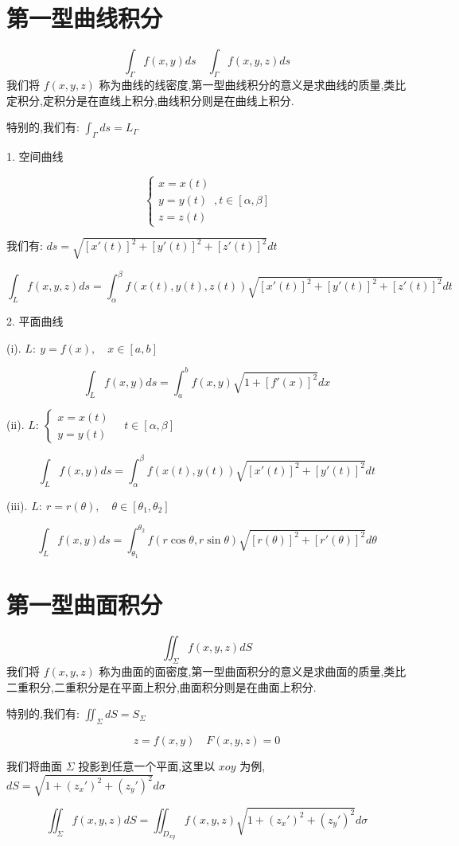 \section{第一型曲线积分}
\begin{definition}[第一型曲线积分]
	$$\int_{\Gamma}f(x,y)ds\quad \int_{\Gamma}f(x,y,z)ds$$
	我们将 $f(x,y,z)$ 称为曲线的线密度,第一型曲线积分的意义是求曲线的质量,类比定积分,定积分是在直线上积分,曲线积分则是在曲线上积分.
	
	特别的,我们有: $\int_{\Gamma}ds=L_{\Gamma}$
\end{definition}
\begin{theorem}[曲线积分的求解]
	
	1. 空间曲线
	
	$$\left\lbrace \begin{array}{l}
		x=x(t)\\
		y=y(t)\\
		z=z(t)
	\end{array}\right. ,t\in[\alpha,\beta]$$
	
	我们有: $ds=\sqrt{[x'(t)]^{2}+[y'(t)]^{2}+[z'(t)]^{2}}dt$
	
	$$\int_{L}f(x,y,z)ds=\int_{\alpha}^{\beta}f(x(t),y(t),z(t))\sqrt{[x'(t)]^{2}+[y'(t)]^{2}+[z'(t)]^{2}}dt$$
	
	2. 平面曲线
	
	(i). $L:\ y=f(x),\quad x\in[a,b]$
	
	$$\int_{L}f(x,y)ds=\int_{a}^{b}f(x,y)\sqrt{1+[f'(x)]^2}dx$$
	
	(ii). $L:\ \left\lbrace \begin{array}{l}
		x=x(t)\\
		y=y(t)
	\end{array}\right.\quad t\in[\alpha,\beta]$
	
	$$\int_{L}f(x,y)ds=\int_{\alpha}^{\beta}f(x(t),y(t))\sqrt{[x'(t)]^2+[y'(t)]^2}dt$$
	
	(iii). $L:\ r=r(\theta),\quad \theta\in[\theta_{1},\theta_{2}]$
	
	$$\int_{L}f(x,y)ds=\int_{\theta_{1}}^{\theta_{2}}f(r\cos \theta,r\sin\theta)\sqrt{[r(\theta)]^2+[r'(\theta)]^2}d\theta$$
\end{theorem}

\section{第一型曲面积分}
\begin{definition}[第一型曲面积分]
	$$\iint_{\Sigma}f(x,y,z)dS$$
	我们将 $f(x,y,z)$ 称为曲面的面密度,第一型曲面积分的意义是求曲面的质量,类比二重积分,二重积分是在平面上积分,曲面积分则是在曲面上积分.
	
	特别的,我们有: $\iint_{\Sigma}dS=S_{\Sigma}$
\end{definition}
\begin{theorem}
	$$z=f(x,y)\quad F(x,y,z)=0$$
	
	我们将曲面 $\Sigma$ 投影到任意一个平面,这里以 $xoy$ 为例,$dS=\sqrt{1+(z_{x}')^2+(z_{y}')^2}d\sigma$
	
	$$\iint_{\Sigma}f(x,y,z)dS=\iint_{D_{xy}}f(x,y,z)\sqrt{1+(z_{x}')^2+(z_{y}')^2}d\sigma$$
\end{theorem}
